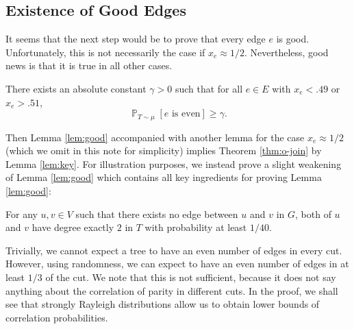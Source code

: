 \documentclass[letterpaper, reqno,12pt]{article}
\newcommand{\PP}{\mathop{{}\mathbb{P}}}
\begin{document}
\subsection{Existence of Good Edges}

It seems that the next step would be to prove that every edge $e$ is good. Unfortunately, this is not necessarily the case if $x_e \approx 1/2$. Nevertheless, good news is that it is true in all other cases.

\begin{lemma} \label{lem:good}
  There exists an absolute constant $\gamma > 0$ such that for all $e \in E$ with $x_e < .49$ or $x_e > .51$,
  $$ \PP_{T \sim \mu}[\text{$e$ is even}] \geq \gamma. $$
\end{lemma}

Then Lemma \ref{lem:good} accompanied with another lemma for the case $x_e \approx 1/2$ (which we omit in this note for simplicity) implies Theorem \ref{thm:o-join} by Lemma \ref{lem:key}. For illustration purposes, we instead prove a slight weakening of Lemma \ref{lem:good} which contains all key ingredients for proving Lemma \ref{lem:good}:

\begin{lemma}
  For any $u, v \in V$ such that there exists no edge between $u$ and $v$ in $G$, both of $u$ and $v$ have degree exactly $2$ in $T$ with probability at least $1/40$.
\end{lemma}

Trivially, we cannot expect a tree to have an even number of edges in every cut. However, using randomness, we can expect to have an even number of edges in at least $1/3$ of the cut. We note that this is not sufficient, because it does not say anything about the correlation of parity in different cuts. In the proof, we shall see that strongly Rayleigh distributions allow us to obtain lower bounds of correlation probabilities.
\end{document}
